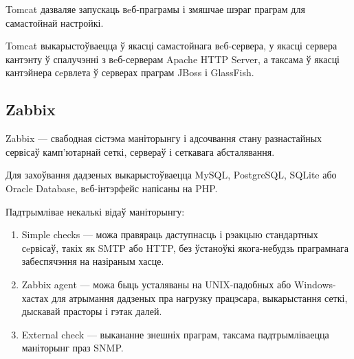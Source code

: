 Tomcat дазваляе запускаць вeб-праграмы і змяшчае шэраг праграм для самастойнай настройкі.

Tomcat выкарыстоўваецца ў якасці самастойнага вeб-сервера, у якасці сервера кантэнту ў спалучэнні з вeб-серверам Apache HTTP Server, а таксама ў якасці кантэйнера сeрвлета ў серверах праграм JBoss і GlassFish.

\subsection{Zabbix}
Zabbix --- свабодная сістэма маніторынгу і адсочвання стану разнастайных сервісаў камп'ютарнай сеткі, сервераў і сеткавага абсталявання.

Для захоўвання дадзеных выкарыстоўваецца MySQL, PostgreSQL, SQLite або Oracle Database, вeб-інтэрфейс напісаны на PHP.

Падтрымлівае некалькі відаў маніторынгу:
\begin{enumerate}
    \item Simple checks --- можа правяраць даступнасць і рэакцыю стандартных сeрвісаў, такіх як SMTP або HTTP, без ўстаноўкі якога-небудзь праграмнага забеспячэння на назіраным хасце.
    \item Zabbix agent --- можа быць усталяваны на UNIX-падобных або Windows-хастах для атрымання дадзеных пра нагрузку працэсара, выкарыстання сеткі, дыскавай прасторы і гэтак далей.
    \item External check --- выкананне знешніх праграм, таксама падтрымліваецца маніторынг праз SNMP.
\end{enumerate}
